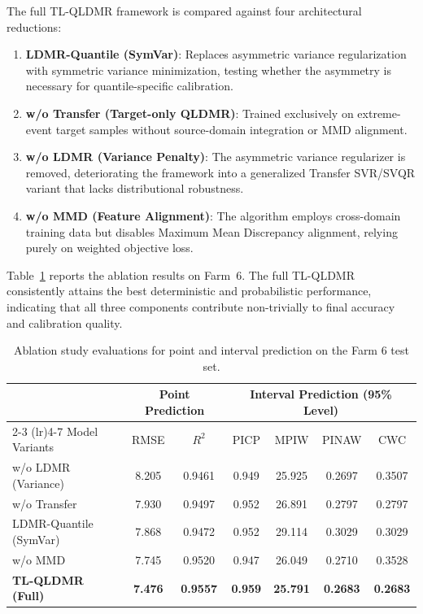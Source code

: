 The full TL-QLDMR framework is compared against four architectural reductions:
\begin{enumerate}
    \item \textbf{LDMR-Quantile (SymVar)}: Replaces asymmetric variance regularization with symmetric variance minimization, testing whether the asymmetry is necessary for quantile-specific calibration.
    \item \textbf{w/o Transfer (Target-only QLDMR)}: Trained exclusively on extreme-event target samples without source-domain integration or MMD alignment.
    \item \textbf{w/o LDMR (Variance Penalty)}: The asymmetric variance regularizer is removed, deteriorating the framework into a generalized Transfer SVR/SVQR variant that lacks distributional robustness.
    \item \textbf{w/o MMD (Feature Alignment)}: The algorithm employs cross-domain training data but disables Maximum Mean Discrepancy alignment, relying purely on weighted objective loss.
\end{enumerate}

Table~\ref{tab:ablation_results} reports the ablation results on Farm~6. The full TL-QLDMR consistently attains the best deterministic and probabilistic performance, indicating that all three components contribute non-trivially to final accuracy and calibration quality.

\begin{table}[ht]
\centering
\caption{Ablation study evaluations for point and interval prediction on the Farm 6 test set.}
\setlength{\tabcolsep}{3mm}
\begin{tabular}{lcccccc}
\toprule
& \multicolumn{2}{c}{Point Prediction} & \multicolumn{4}{c}{Interval Prediction (95\% Level)} \\
\cmidrule(lr){2-3} \cmidrule(lr){4-7}
Model Variants & RMSE & $R^2$ & PICP & MPIW & PINAW & CWC \\
\midrule
w/o LDMR (Variance)     & 8.205 & 0.9461 & 0.949 & 25.925 & 0.2697 & 0.3507 \\
w/o Transfer            & 7.930 & 0.9497 & 0.952 & 26.891 & 0.2797 & 0.2797 \\
LDMR-Quantile (SymVar)  & 7.868 & 0.9472 & 0.952 & 29.114 & 0.3029 & 0.3029 \\
w/o MMD                 & 7.745 & 0.9520 & 0.947 & 26.049 & 0.2710 & 0.3528 \\
\textbf{TL-QLDMR (Full)} & \textbf{7.476} & \textbf{0.9557} & \textbf{0.959} & \textbf{25.791} & \textbf{0.2683} & \textbf{0.2683} \\
\bottomrule
\end{tabular}
\label{tab:ablation_results}
\end{table}

